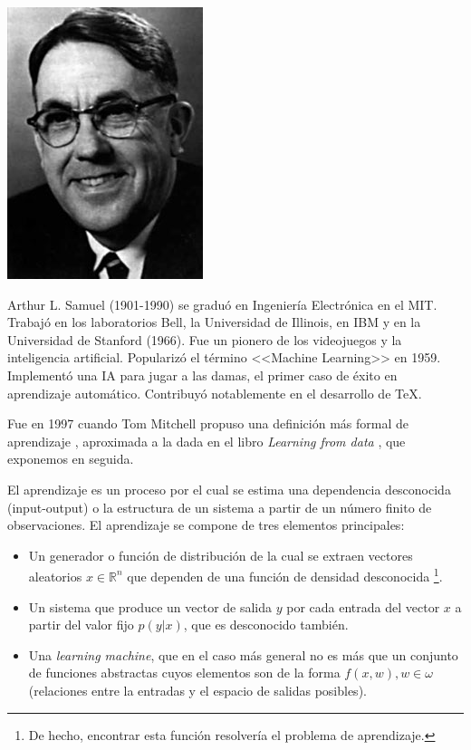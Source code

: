 \documentclass[11pt,twoside,titlepage,a4paper]{article}
\numberwithin{equation}{section} %
\theoremstyle{usual}
\begin{document}
\begin{marginfigure}
    \includegraphics[width=\marginparwidth]{Source/images/arthur_samuel.jpg}
    \caption{Arthur L. Samuel (1901-1990) \cite{samuel-wikipedia} se graduó en Ingeniería Electrónica en el MIT. Trabajó en los laboratorios Bell, la Universidad de Illinois, en IBM y en la Universidad de Stanford (1966). Fue un pionero de los videojuegos y la inteligencia artificial. Popularizó el término <<Machine Learning>> en 1959. Implementó una IA para jugar a las damas, el primer caso  de éxito en aprendizaje automático. Contribuyó notablemente en el desarrollo de TeX.}
\end{marginfigure}

Fue en 1997 cuando Tom Mitchell propuso una definición más formal de aprendizaje \cite{tom-michell-machine-learning}, aproximada a la dada en el libro \textit{Learning from data} \cite{learning-from-data-1-2}, que exponemos en seguida.

El aprendizaje es un proceso por el cual se estima una dependencia desconocida (input-output) o la estructura de un sistema a partir de un número finito de observaciones.  El aprendizaje se compone de tres elementos principales: 

\begin{itemize}
    \item Un generador o función de distribución de la cual se extraen 
    vectores aleatorios 
    $x \in \mathbb R^ n$ 
    que dependen de una función de densidad desconocida \footnote{De hecho, encontrar esta función resolvería el problema de aprendizaje.}.
    
    \item Un sistema que produce un vector de salida $y$ por cada entrada del vector $x$ a partir del valor fijo $p(y|x)$, que es desconocido también. 
    
    \item Una \textit{learning machine}, que en el caso más general no es  más que un conjunto de funciones abstractas cuyos elementos son de la forma $f(x,w), w\in \omega$  (relaciones entre la entradas y el espacio de salidas posibles).
\end{itemize}
\end{document}
